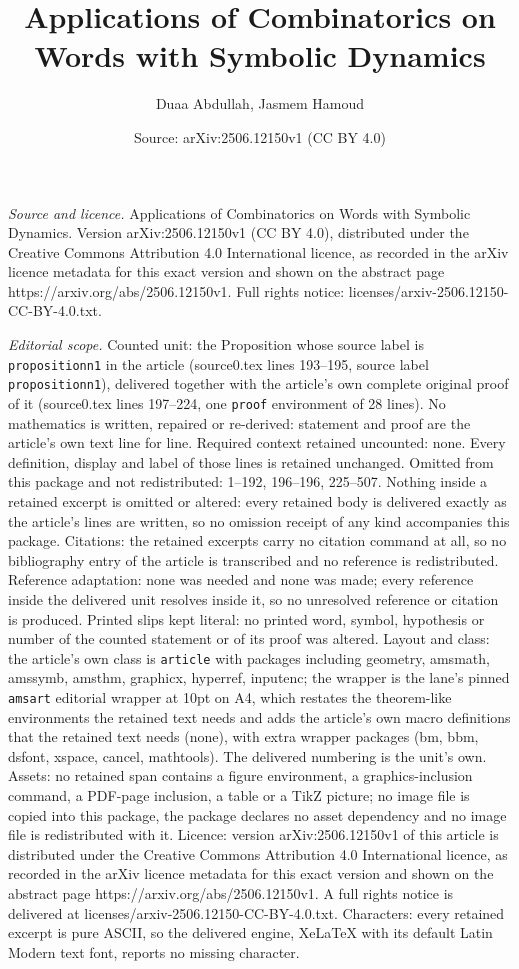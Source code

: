 \documentclass[10pt,a4paper]{amsart}
\title[Applications of Combinatorics on Words with Symbolic Dynamic]{Applications of Combinatorics on Words with Symbolic Dynamics}
\author{Duaa Abdullah, Jasmem Hamoud}
\date{Source: arXiv:2506.12150v1 (CC BY 4.0)}
\begin{document}
\maketitle

\noindent\emph{Source and licence.} Applications of Combinatorics on Words with Symbolic Dynamics. Version arXiv:2506.12150v1 (CC BY 4.0), distributed under the Creative Commons Attribution 4.0 International licence, as recorded in the arXiv licence metadata for this exact version and shown on the abstract page https://arxiv.org/abs/2506.12150v1. Full rights notice: licenses/arxiv-2506.12150-CC-BY-4.0.txt.\par\smallskip

\noindent\textit{Editorial scope.} Counted unit: the Proposition whose source label is \texttt{propositionn1} in the article (source0.tex lines 193--195, source label \texttt{propositionn1}), delivered together with the article's own complete original proof of it (source0.tex lines 197--224, one \texttt{proof} environment of 28 lines). No mathematics is written, repaired or re-derived: statement and proof are the article's own text line for line. Required context retained uncounted: none. Every definition, display and label of those lines is retained unchanged. Omitted from this package and not redistributed: 1--192, 196--196, 225--507. Nothing inside a retained excerpt is omitted or altered: every retained body is delivered exactly as the article's lines are written, so no omission receipt of any kind accompanies this package. Citations: the retained excerpts carry no citation command at all, so no bibliography entry of the article is transcribed and no reference is redistributed. Reference adaptation: none was needed and none was made; every reference inside the delivered unit resolves inside it, so no unresolved reference or citation is produced. Printed slips kept literal: no printed word, symbol, hypothesis or number of the counted statement or of its proof was altered. Layout and class: the article's own class is \texttt{article} with packages including geometry, amsmath, amssymb, amsthm, graphicx, hyperref, inputenc; the wrapper is the lane's pinned \texttt{amsart} editorial wrapper at 10pt on A4, which restates the theorem-like environments the retained text needs and adds the article's own macro definitions that the retained text needs (none), with extra wrapper packages (bm, bbm, dsfont, xspace, cancel, mathtools). The delivered numbering is the unit's own. Assets: no retained span contains a figure environment, a graphics-inclusion command, a PDF-page inclusion, a table or a TikZ picture; no image file is copied into this package, the package declares no asset dependency and no image file is redistributed with it. Licence: version arXiv:2506.12150v1 of this article is distributed under the Creative Commons Attribution 4.0 International licence, as recorded in the arXiv licence metadata for this exact version and shown on the abstract page https://arxiv.org/abs/2506.12150v1. A full rights notice is delivered at licenses/arxiv-2506.12150-CC-BY-4.0.txt. Characters: every retained excerpt is pure ASCII, so the delivered engine, XeLaTeX with its default Latin Modern text font, reports no missing character.
\end{document}
